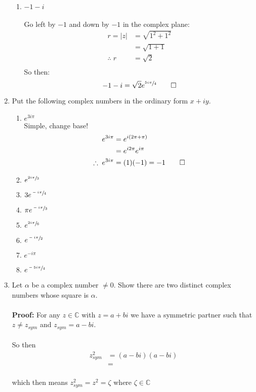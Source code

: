 \begin{enumerate}
\begin{enumerate}
		\item $-1 - i$ \\
		\\
		Go left by $-1$ and down by $-1$ in the complex plane:
		\begin{align*}
		r = |z| &= \sqrt{1^2 + 1^2} \\
		&= \sqrt{1 + 1} \\
		\therefore \; r &= \sqrt{2}\\
		\end{align*}
		So then:
		\[ -1 - i = \sqrt{2}e^{\sfrac{5i\pi}{4}} \qed \]
	\end{enumerate}
	
	\item Put the following complex numbers in the ordinary form $x + iy.$
	\begin{enumerate}
		\item $e^{3i\pi}$ \\
		Simple, change base!
		\begin{align*}
			e^{3i\pi} &= e^{i(2\pi + \pi)} \\
			&= e^{i2\pi}e^{i\pi} \\
			\therefore \; e^{3i\pi} &= (1)(-1) = -1 \qed
		\end{align*}
		\item $e^{\sfrac{2i\pi}{3}}$
		\item $3e^{\sfrac{-i\pi}{4}}$
		\item $\pi e^{\sfrac{-i\pi}{3}}$
		\item $e^{\sfrac{2i\pi}{6}}$
		\item $e^{\sfrac{-i\pi}{2}}$
		\item $e^{-i\pi}$
		\item $e^{\sfrac{-5i\pi}{4}}$
	\end{enumerate}
	
	\item Let $\alpha$ be a complex number $\neq 0.$ Show there are two distinct complex numbers whose square is $\alpha.$ \\
	\\
	\textbf{Proof:}
	For any $z \in \mathbb{C}$ with $z = a + bi$ we have a symmetric partner such that $z \neq z_{sym}$ and $z_{sym} =  a - bi.$ \\ 
	\\
	So then 
	\begin{align*}
		z_{sym}^2 &= (a - bi)(a - bi) \\
		&= 
	\end{align*}
	\\
	which then means $z_{sym}^2 = z^2 = \zeta$ where $\zeta \in \mathbb{C}$
	

\end{enumerate}
